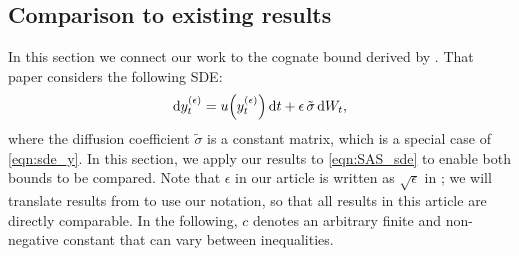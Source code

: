 \subsection{Comparison to existing results}
\label{sec:comparison}
In this section we connect our work to the cognate bound derived by \citet{Sanz-AlonsoStuart_2017_GaussianApproximationsSmall}.
That paper considers the following SDE:
\begin{equation}\label{eqn:SAS_sde}
	\dif y_t^{(\epsilon)} = u\!\left(y_t^{(\epsilon)}\right)\dif t + \epsilon \, \tilde{\sigma}\dif W_t,
\end{equation}
where the diffusion coefficient \(\tilde{\sigma}\) is a constant matrix, which is a special case of \cref{eqn:sde_y}.
In this section, we apply our results to \cref{eqn:SAS_sde} to enable both bounds to be compared.
Note that \(\epsilon\) in our article is written as \(\sqrt{\epsilon}\) in \cite{Sanz-AlonsoStuart_2017_GaussianApproximationsSmall}; we will translate results from \cite{Sanz-AlonsoStuart_2017_GaussianApproximationsSmall} to use our notation, so that all results in this article are directly comparable.
In the following, \(c\) denotes an arbitrary finite and non-negative constant that can vary between inequalities.

